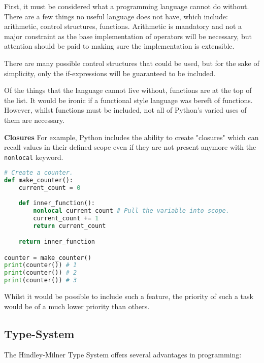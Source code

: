 \documentclass{l4proj}
\begin{document}
First, it must be considered what a programming language cannot do without.
There are a few things no useful language does not have, which include: arithmetic, control structures, functions.
Arithmetic is mandatory and not a major constraint as the base implementation of operators will be necessary, but attention should be paid to making sure the implementation is extensible.

There are many possible control structures that could be used, but for the sake of simplicity, only the if-expressions will be guaranteed to be included. 

Of the things that the language cannot live without, functions are at the top of the list.
It would be ironic if a functional style language was bereft of functions.
However, whilst functions must be included, not all of Python's varied uses of them are necessary.

\textbf{Closures}
For example, Python includes the ability to create "closures" which can recall values in their defined scope even if they are not present anymore with the \texttt{nonlocal} keyword.

\begin{lstlisting}[language=Python, caption={An example of a closure in Python. See the use of the 'nonlocal' keyword to pull the surrounding defintion of 'current\_count' into the scope of 'inner\_function'.}, label={lst:py-closure}]
# Create a counter.
def make_counter():
    current_count = 0
    
    def inner_function():
        nonlocal current_count # Pull the variable into scope.
        current_count += 1
        return current_count

    return inner_function

counter = make_counter()
print(counter()) # 1
print(counter()) # 2
print(counter()) # 3
\end{lstlisting}

Whilst it would be possible to include such a feature, the priority of such a task would be of a much lower priority than others.

\textbf{}


\subsection{Type-System}
The Hindley-Milner Type System offers several advantages in programming:
\end{document}

